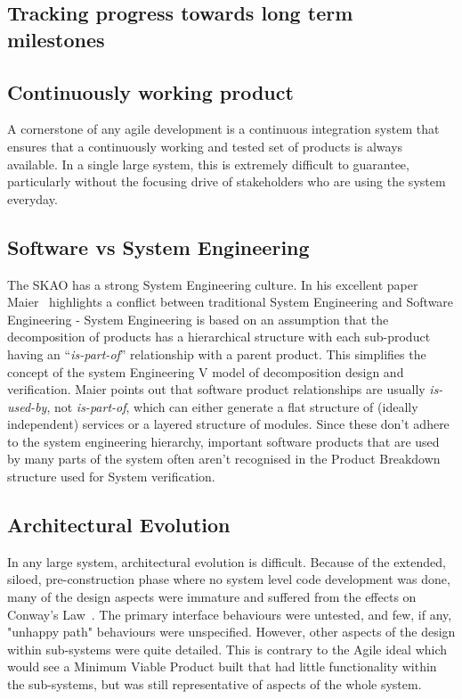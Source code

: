 \documentclass[a4paper,
               biblatex,     %
               keeplastbox,   %
               ]{jacow}
\begin{document}
\subsection{Tracking progress towards long term milestones}
\subsection{Continuously working product}
A cornerstone of any agile development is a continuous integration system that ensures that a continuously  working and tested set of products is always available. In a single large system, this is extremely difficult to guarantee, particularly without the focusing drive of stakeholders who are using the system everyday.

\subsection{Software vs System Engineering}
The SKAO has a strong System Engineering culture. In his excellent paper Maier~\cite{Maier2006} highlights a conflict between traditional System Engineering and Software Engineering - System Engineering is based on an assumption that the decomposition of products has a hierarchical structure with each sub-product having an ``{\em is-part-of}'' relationship with a parent product. This simplifies the concept of the system Engineering V model of decomposition design and verification. Maier points out that software product relationships are usually {\em is-used-by}, not {\em is-part-of}, which can either generate a flat structure of (ideally independent) services or a layered structure of modules. Since these don't adhere to the system engineering hierarchy, important software products that are used by many parts of the system often aren't recognised in the Product Breakdown structure used for System verification.

\subsection{Architectural Evolution}
In any large system, architectural evolution is difficult. Because of the extended, siloed, pre-construction phase where no system level code development was done, many of the design aspects were immature and suffered from the effects on Conway's Law~\cite{Conway}. The primary interface behaviours were untested, and few, if any, "unhappy path" behaviours were unspecified. However, other aspects of the design within sub-systems were quite detailed. This is contrary to the Agile ideal which would see a Minimum Viable Product built that had little functionality within the sub-systems, but was still representative of aspects of the whole system. 
\end{document}
